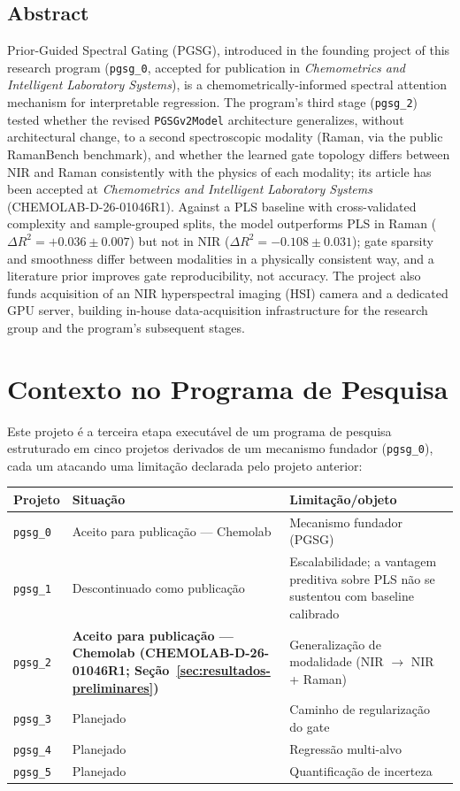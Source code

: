 \documentclass[11pt,a4paper]{article}
\begin{document}
\subsection*{Abstract}
Prior-Guided Spectral Gating (PGSG), introduced in the founding project of this research program (\texttt{pgsg\_0}, accepted for publication in \emph{Chemometrics and Intelligent Laboratory Systems}), is a chemometrically-informed spectral attention mechanism for interpretable regression. The program's third stage (\texttt{pgsg\_2}) tested whether the revised \texttt{PGSGv2Model} architecture generalizes, without architectural change, to a second spectroscopic modality (Raman, via the public RamanBench benchmark), and whether the learned gate topology differs between NIR and Raman consistently with the physics of each modality; its article has been accepted at \emph{Chemometrics and Intelligent Laboratory Systems} (CHEMOLAB-D-26-01046R1). Against a PLS baseline with cross-validated complexity and sample-grouped splits, the model outperforms PLS in Raman ($\Delta R^2=+0.036\pm0.007$) but not in NIR ($\Delta R^2=-0.108\pm0.031$); gate sparsity and smoothness differ between modalities in a physically consistent way, and a literature prior improves gate reproducibility, not accuracy. The project also funds acquisition of an NIR hyperspectral imaging (HSI) camera and a dedicated GPU server, building in-house data-acquisition infrastructure for the research group and the program's subsequent stages.

\section{Contexto no Programa de Pesquisa}

Este projeto é a terceira etapa executável de um programa de pesquisa estruturado em cinco projetos derivados de um mecanismo fundador (\texttt{pgsg\_0}), cada um atacando uma limitação declarada pelo projeto anterior:

\begin{center}
\begin{tabular}{lll}
\toprule
Projeto & Situação & Limitação/objeto \\
\midrule
\texttt{pgsg\_0} & Aceito para publicação --- Chemolab & Mecanismo fundador (PGSG) \\
\texttt{pgsg\_1} & Descontinuado como publicação & Escalabilidade; a vantagem preditiva sobre PLS não se sustentou com baseline calibrado \\
\texttt{pgsg\_2} & \textbf{Aceito para publicação --- Chemolab (CHEMOLAB-D-26-01046R1; Seção~\ref{sec:resultados-preliminares})} & Generalização de modalidade (NIR $\to$ NIR + Raman) \\
\texttt{pgsg\_3} & Planejado & Caminho de regularização do gate \\
\texttt{pgsg\_4} & Planejado & Regressão multi-alvo \\
\texttt{pgsg\_5} & Planejado & Quantificação de incerteza \\
\bottomrule
\end{tabular}
\end{center}
\end{document}
